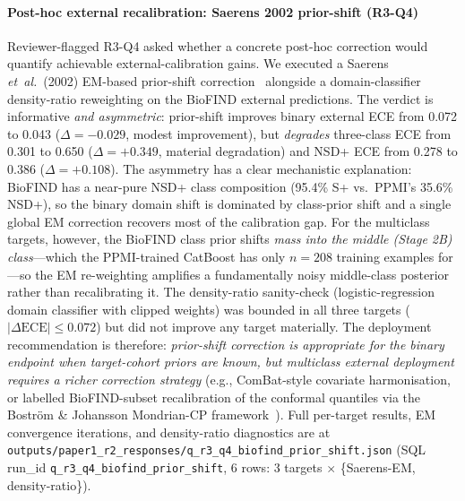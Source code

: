 \paragraph*{Post-hoc external recalibration: Saerens 2002 prior-shift (R3-Q4)} Reviewer-flagged R3-Q4 asked whether a concrete post-hoc correction would quantify achievable external-calibration gains. We executed a Saerens \textit{et~al.}~(2002) EM-based prior-shift correction~\cite{saerens2002priorshift} alongside a domain-classifier density-ratio reweighting on the BioFIND external predictions. The verdict is informative \emph{and asymmetric}: prior-shift improves binary external ECE from 0.072 to 0.043 ($\Delta{=}{-}0.029$, modest improvement), but \emph{degrades} three-class ECE from 0.301 to 0.650 ($\Delta{=}{+}0.349$, material degradation) and NSD+ ECE from 0.278 to 0.386 ($\Delta{=}{+}0.108$). The asymmetry has a clear mechanistic explanation: BioFIND has a near-pure NSD+ class composition (95.4\% S+ vs.\ PPMI's 35.6\% NSD+), so the binary domain shift is dominated by class-prior shift and a single global EM correction recovers most of the calibration gap. For the multiclass targets, however, the BioFIND class prior shifts \emph{mass into the middle (Stage 2B) class}---which the PPMI-trained CatBoost has only $n{=}208$ training examples for---so the EM re-weighting amplifies a fundamentally noisy middle-class posterior rather than recalibrating it. The density-ratio sanity-check (logistic-regression domain classifier with clipped weights) was bounded in all three targets ($|\Delta\text{ECE}| \leq 0.072$) but did not improve any target materially. The deployment recommendation is therefore: \emph{prior-shift correction is appropriate for the binary endpoint when target-cohort priors are known, but multiclass external deployment requires a richer correction strategy} (e.g., ComBat-style covariate harmonisation, or labelled BioFIND-subset recalibration of the conformal quantiles via the Bostr\"{o}m \& Johansson Mondrian-CP framework~\cite{bostrom2025mondrian}). Full per-target results, EM convergence iterations, and density-ratio diagnostics are at \texttt{outputs/paper1\_r2\_responses/q\_r3\_q4\_biofind\_prior\_shift.json} (SQL run\_id \texttt{q\_r3\_q4\_biofind\_prior\_shift}, 6 rows: 3 targets $\times$ \{Saerens-EM, density-ratio\}).

